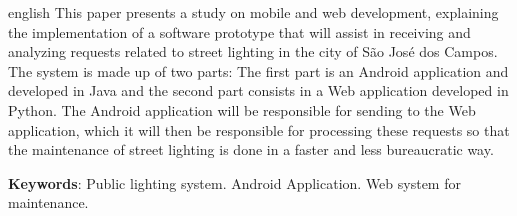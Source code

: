 \documentclass[
	article,			%
	11pt,				%
	oneside,			%
	a4paper,			%
	english,			%
	brazil,				%
	sumario=tradicional
	]{abntex2}
\begin{document}
\emptythanks
\maketitle
\renewcommand{\resumoname}{Abstract}
\begin{resumoumacoluna}
 \begin{otherlanguage*}{english}
   This paper presents a study on mobile and web development, explaining the implementation of a software prototype that will assist in receiving and analyzing requests related to street lighting in the city of São José dos Campos.
   The system is made up of two parts: The first part is an Android application and developed in Java and the second part consists in a Web application developed in Python.
   The Android application will be responsible for sending to the Web application, which it will then be responsible for processing these requests so that the maintenance of street lighting is done in a faster and less bureaucratic way.
   \vspace{\onelineskip}

   \noindent
   \textbf{Keywords}: Public lighting system. Android Application. Web system for maintenance.
 \end{otherlanguage*}
\end{resumoumacoluna}



\end{document}
